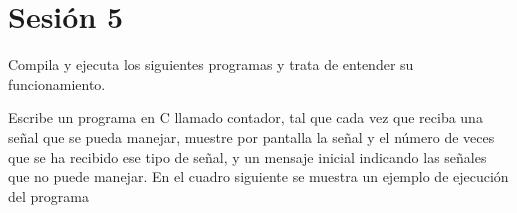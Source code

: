 \section{Sesión 5}

\begin{exercise}
Compila y ejecuta los siguientes programas y trata de entender su funcionamiento.
\end{exercise}

\begin{exercise}
Escribe un programa en C llamado contador, tal que cada vez que reciba una señal
que se pueda manejar, muestre por pantalla la señal y el número de veces que se ha recibido ese
tipo de señal, y un mensaje inicial indicando las señales que no puede manejar. En el cuadro
siguiente se muestra un ejemplo de ejecución del programa
\end{exercise}
